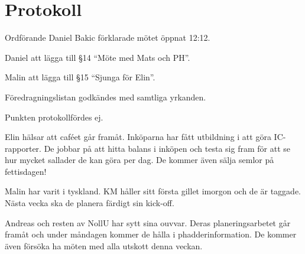 \documentclass[10pt]{article}
\def\mo{Daniel Bakic}
\begin{document}
\section*{Protokoll}
\begin{paragrafer}
Ordförande {\mo} förklarade mötet öppnat 12:12.

{\valavmo}

{\valavms}

{\valavj}

{\tosg}

{\ingaadj}


Daniel \ypa att lägga till \S14 ``Möte med Mats och PH''.

Malin \ypa att lägga till \S15 ``Sjunga för Elin''.

Föredragningslistan godkändes med samtliga yrkanden.


\begin{fyllnadsval} %
\end{fyllnadsval}

\begin{paragrafer}
Punkten protokollfördes ej.


  Elin hälsar att caféet går framåt. Inköparna har fått utbildning i att göra IC-rapporter. De jobbar på att hitta balans i inköpen och testa sig fram för att se hur mycket sallader de kan göra per dag. De kommer även sälja semlor på fettisdagen!

  Malin har varit i tyskland. KM håller sitt första gillet imorgon och de är taggade. Nästa vecka ska de planera färdigt sin kick-off.

  Andreas och resten av NollU har sytt sina ouvvar. Deras planeringsarbetet går framåt och under måndagen kommer de hålla i phadderinformation. De kommer även försöka ha möten med alla utskott denna veckan.


\end{paragrafer}
\end{paragrafer}
\end{document}
